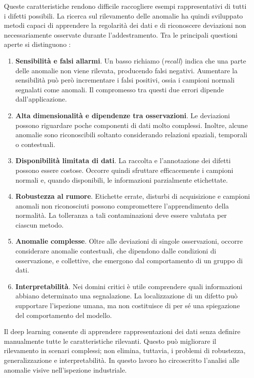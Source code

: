 Queste caratteristiche rendono difficile raccogliere esempi rappresentativi di tutti i difetti possibili. La ricerca sul rilevamento delle anomalie ha quindi sviluppato metodi capaci di apprendere la regolarità dei dati e di riconoscere deviazioni non necessariamente osservate durante l'addestramento. Tra le principali questioni aperte si distinguono \cite{Pang_et_al._2021}:
\begin{enumerate}
    \item \textbf{Sensibilità e falsi allarmi}. Un basso richiamo (\textit{recall}) indica che una parte delle anomalie non viene rilevata, producendo falsi negativi. Aumentare la sensibilità può però incrementare i falsi positivi, ossia i campioni normali segnalati come anomali. Il compromesso tra questi due errori dipende dall'applicazione.
    \item \textbf{Alta dimensionalità e dipendenze tra osservazioni}. Le deviazioni possono riguardare poche componenti di dati molto complessi. Inoltre, alcune anomalie sono riconoscibili soltanto considerando relazioni spaziali, temporali o contestuali.
    \item \textbf{Disponibilità limitata di dati}. La raccolta e l'annotazione dei difetti possono essere costose. Occorre quindi sfruttare efficacemente i campioni normali e, quando disponibili, le informazioni parzialmente etichettate.
    \item \textbf{Robustezza al rumore}. Etichette errate, disturbi di acquisizione e campioni anomali non riconosciuti possono compromettere l'apprendimento della normalità. La tolleranza a tali contaminazioni deve essere valutata per ciascun metodo.
    \item \textbf{Anomalie complesse}. Oltre alle deviazioni di singole osservazioni, occorre considerare anomalie contestuali, che dipendono dalle condizioni di osservazione, e collettive, che emergono dal comportamento di un gruppo di dati.
    \item \textbf{Interpretabilità}. Nei domini critici è utile comprendere quali informazioni abbiano determinato una segnalazione. La localizzazione di un difetto può supportare l'ispezione umana, ma non costituisce di per sé una spiegazione del comportamento del modello.
\end{enumerate}

Il deep learning consente di apprendere rappresentazioni dei dati senza definire manualmente tutte le caratteristiche rilevanti. Questo può migliorare il rilevamento in scenari complessi; non elimina, tuttavia, i problemi di robustezza, generalizzazione e interpretabilità. In questo lavoro ho circoscritto l'analisi alle anomalie visive nell'ispezione industriale.

